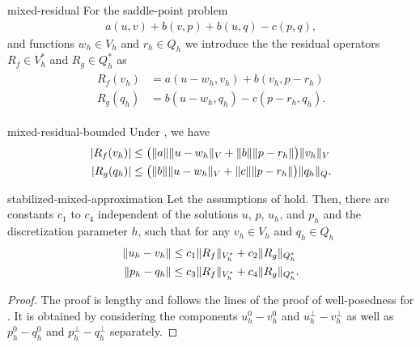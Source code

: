 \begin{Definition}{mixed-residual}
  For the saddle-point problem
  \begin{gather*}
    a(u,v) + b(v,p) + b(u,q) - c(p,q),
  \end{gather*}
  and functions $w_h\in V_h$ and $r_h\in Q_h$ we introduce the the
  residual operators $R_f \in V_h^*$ and $R_g\in Q_h^*$ as
  \begin{gather*}
    \begin{split}
      R_f(v_h) &= a(u-w_h, v_h) + b(v_h, p-r_h) \\
      R_g(q_h) &= b(u-w_h, q_h) - c(p-r_h, q_h).
    \end{split}
  \end{gather*}
\end{Definition}

\begin{Corollary}{mixed-residual-bounded}
  Under , we have
  \begin{gather}
    \begin{split}
      \lvert R_f(v_h)\rvert
      &\le \bigl(\lVert a\rVert \lVert u-w_h\rVert_V + \lVert b\rVert \lVert p-r_h\rVert\bigr)
      \lVert v_h\rVert_V
      \\
      \lvert R_g(q_h)\rvert
      &\le \bigl(\lVert b\rVert \lVert u-w_h\rVert_V + \lVert c\rVert \lVert p-r_h\rVert\bigr)
      \lVert q_h\rVert_Q.
    \end{split}
  \end{gather}
\end{Corollary}

\begin{Lemma}{stabilized-mixed-approximation}
  Let the assumptions of
   hold. Then, there
  are constants $c_1$ to $c_4$ independent of the solutions $u$, $p$,
  $u_h$, and $p_h$ and the discretization parameter $h$, such that for
  any $v_h\in V_h$ and $q_h\in Q_h$
  \begin{gather}
    \label{eq:infsup:16}
    \begin{split}
      \lVert u_h-v_h\rVert &\le c_1 \lVert R_f\rVert_{V_h^*} + c_2
      \lVert R_g\rVert_{Q_h^*}
      \\
      \lVert p_h-q_h\rVert &\le c_3 \lVert R_f\rVert_{V_h^*} + c_4
      \lVert R_g\rVert_{Q_h^*}.
    \end{split}
  \end{gather}
\end{Lemma}

\begin{proof}
  The proof is lengthy and follows the lines of the proof of
  well-posedness for
  . It is obtained by
  considering the components $u_h^0-v_h^0$ and $u_h^\perp-v_h^\perp$
  as well as $p_h^0-q_h^0$ and $p_h^\perp-q_h^\perp$ separately.
\end{proof}

